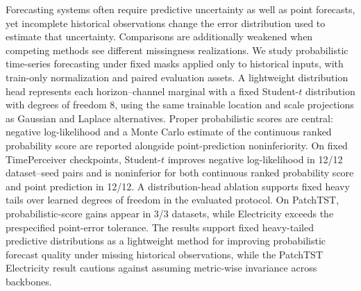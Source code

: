 Forecasting systems often require predictive uncertainty as well as point forecasts, yet incomplete historical observations change the error distribution used to estimate that uncertainty. Comparisons are additionally weakened when competing methods see different missingness realizations. We study probabilistic time-series forecasting under fixed masks applied only to historical inputs, with train-only normalization and paired evaluation assets. A lightweight distribution head represents each horizon--channel marginal with a fixed Student-$t$ distribution with degrees of freedom $8$, using the same trainable location and scale projections as Gaussian and Laplace alternatives. Proper probabilistic scores are central: negative log-likelihood and a Monte Carlo estimate of the continuous ranked probability score are reported alongside point-prediction noninferiority. On fixed TimePerceiver checkpoints, Student-$t$ improves negative log-likelihood in 12/12 dataset--seed pairs and is noninferior for both continuous ranked probability score and point prediction in 12/12. A distribution-head ablation supports fixed heavy tails over learned degrees of freedom in the evaluated protocol. On PatchTST, probabilistic-score gains appear in 3/3 datasets, while Electricity exceeds the prespecified point-error tolerance. The results support fixed heavy-tailed predictive distributions as a lightweight method for improving probabilistic forecast quality under missing historical observations, while the PatchTST Electricity result cautions against assuming metric-wise invariance across backbones.
